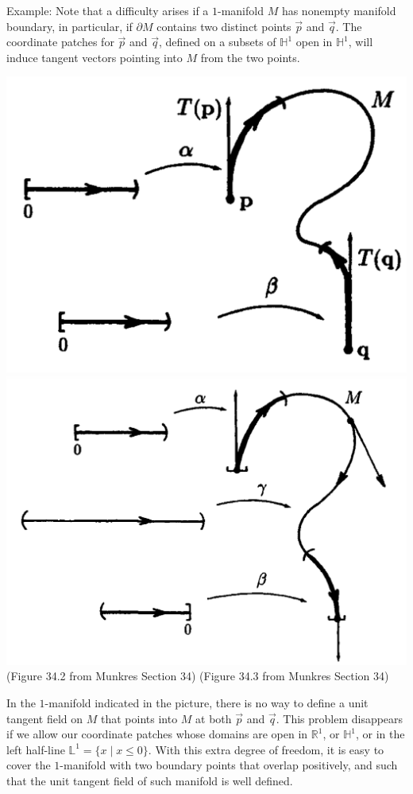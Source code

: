 \documentclass[11pt,oneside]{book}
\theoremstyle{break}
\theoremstyle{break}
\newcommand{\R}{\mathbb{R}}
\newcommand{\example}{\color{green}Example: \color{black}}
\begin{document}
\example Note that a difficulty arises if a $1$-manifold $M$ has nonempty manifold boundary, in particular, if $\partial M$ contains two distinct points $\vec{p}$ and $\vec{q}$. The coordinate patches for $\vec{p}$ and $\vec{q}$, defined on a subsets of $\mathbb{H}^1$ open in $\mathbb{H}^1$, will induce tangent vectors pointing into $M$ from the two points. 
\begin{center}
\includegraphics[scale=0.19]{tangent1.png}\qquad\qquad\qquad \includegraphics[scale=0.25]{tangent1-1.png}\\
(Figure 34.2 from Munkres Section 34)\qquad\qquad\qquad\quad
(Figure 34.3 from Munkres Section 34)\quad
\end{center}
In the $1$-manifold indicated in the picture, there is no way to define a unit tangent field on $M$ that points into $M$ at both $\vec{p}$ and $\vec{q}$. This problem disappears if we allow our coordinate patches whose domains are open in $\R^1$, or $\mathbb{H}^1$, or in  the left half-line $\mathbb{L}^1 = \{x \mid x\leq 0\}$. With this extra degree of freedom, it is easy to cover the $1$-manifold with two boundary points that overlap positively, and such that the unit tangent field of such manifold is well defined. \\
\end{document}
